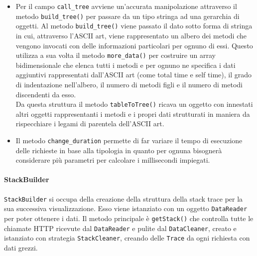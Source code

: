\begin{itemize}
	\item Per il campo \texttt{call\_tree} avviene un'accurata manipolazione attraverso il metodo \texttt{build\_tree()} per passare da un tipo stringa ad una gerarchia di oggetti.
	Al metodo \texttt{build\_tree()} viene passato il dato sotto forma di stringa in cui, attraverso l'ASCII art, viene rappresentato un albero dei metodi che vengono invocati con delle informazioni particolari per ognuno di essi. Questo utilizza a sua volta il metodo \texttt{more\_data()} per costruire un array bidimensionale che elenca tutti i metodi e per ognuno ne specifica i dati aggiuntivi rappresentati dall'ASCII art (come total time e self time), il grado di indentazione nell'albero, il numero di metodi figli e il numero di metodi discendenti da esso. \\ Da questa struttura il metodo \texttt{tableToTree()} ricava un oggetto con innestati altri oggetti rappresentanti i metodi e i propri dati strutturati in maniera da rispecchiare i legami di parentela dell'ASCII art.
	\item 	Il metodo \texttt{change\_duration} permette di far variare il tempo di esecuzione delle richieste in base alla tipologia in quanto per ognuna bisognerà considerare più parametri per calcolare i millisecondi impiegati.
\end{itemize}

\paragraph{StackBuilder}
\label{sec:StackBuilder}

\texttt{StackBuilder} si occupa della creazione della struttura della stack trace per la sua successiva visualizzazione.
Esso viene istanziato con un oggetto \texttt{DataReader} per poter ottenere i dati.
Il metodo principale è \texttt{getStack()} che controlla tutte le chiamate HTTP ricevute dal \texttt{DataReader} e pulite dal \texttt{DataCleaner}, creato e istanziato con strategia \texttt{StackCleaner}, creando delle \texttt{Trace} da ogni richiesta con dati grezzi.